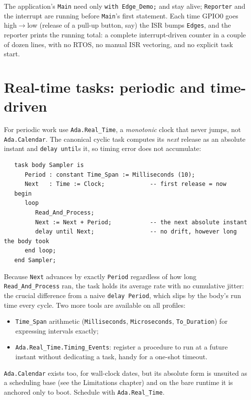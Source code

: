 The application's \texttt{Main} need only \texttt{with Edge\_Demo;} and stay
alive; \texttt{Reporter} and the interrupt are running before \texttt{Main}'s
first statement. Each time GPIO0 goes high$\rightarrow$low (release of a pull-up
button, say) the ISR bumps \texttt{Edges}, and the reporter prints the running
total: a complete interrupt-driven counter in a couple of dozen lines, with no
RTOS, no manual ISR vectoring, and no explicit task start.

\section{Real-time tasks: periodic and time-driven}
\label{sec:realtime}

For periodic work use \texttt{Ada.Real\_Time}, a \emph{monotonic} clock that
never jumps, not \texttt{Ada.Calendar}. The canonical cyclic task computes its
\emph{next} release as an absolute instant and \texttt{delay until}s it, so timing
error does not accumulate:

\begin{lstlisting}
   task body Sampler is
      Period : constant Time_Span := Milliseconds (10);
      Next   : Time := Clock;             -- first release = now
   begin
      loop
         Read_And_Process;
         Next := Next + Period;           -- the next absolute instant
         delay until Next;                -- no drift, however long the body took
      end loop;
   end Sampler;
\end{lstlisting}

Because \texttt{Next} advances by exactly \texttt{Period} regardless of how long
\texttt{Read\_And\_Process} ran, the task holds its average rate with no cumulative
jitter: the crucial difference from a naive \texttt{delay Period}, which slips
by the body's run time every cycle. Two more tools are available on all profiles:

\begin{itemize}
  \item \texttt{Time\_Span} arithmetic (\texttt{Milliseconds},
        \texttt{Microseconds}, \texttt{To\_Duration}) for expressing intervals
        exactly;
  \item \texttt{Ada.Real\_Time.Timing\_Events}: register a procedure to run at
        a future instant without dedicating a task, handy for a one-shot timeout.
\end{itemize}

\texttt{Ada.Calendar} exists too, for wall-clock dates, but its absolute form is
unsuited as a scheduling base (see the Limitations chapter) and on the bare
runtime it is anchored only to boot. Schedule with \texttt{Ada.Real\_Time}.

